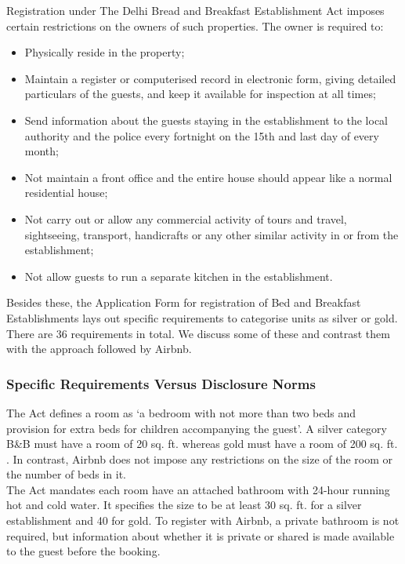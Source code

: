 \documentclass[a4paper, 12pt]{article}
\begin{document}
  Registration under The Delhi Bread and Breakfast Establishment Act imposes certain restrictions on the owners of such properties. The owner is required to: 
\begin{itemize}
\item Physically reside in the property;
\item Maintain a register or computerised record in electronic form, giving detailed particulars of the guests, and keep it available for inspection at all times;
\item  Send information about the guests staying in the establishment to the local authority and the police every fortnight on the 15th and last day of every month;
\item Not maintain a front office and the entire house should appear like a normal residential house;
\item Not carry out or allow any commercial activity of tours and travel, sightseeing, transport, handicrafts or any other similar activity in or from the establishment;
\item  Not allow guests to run a separate kitchen in the establishment.
\end{itemize}                                  
Besides these, the Application Form for registration of Bed and Breakfast Establishments lays out specific requirements to categorise units as silver or gold. There are 36 requirements in total. We discuss some of these and contrast them with the approach followed by Airbnb.

	\subsubsection{Specific Requirements Versus Disclosure Norms}
The Act defines a room as ‘a bedroom with not more than two beds and provision for extra beds for children accompanying the guest’. A silver category B\&B must have a room of 20 sq. ft. whereas gold must have a room of 200 sq. ft. . In contrast, Airbnb does not impose any restrictions on the size of the room or the number of beds in it.\\

The Act mandates each room have an attached bathroom with 24-hour running hot and cold water. It specifies the size to be at least 30 sq. ft. for a silver establishment and 40 for gold. To register with Airbnb, a private bathroom is not required, but information about whether it is private or shared is made available to the guest before the booking.\\
\end{document}
